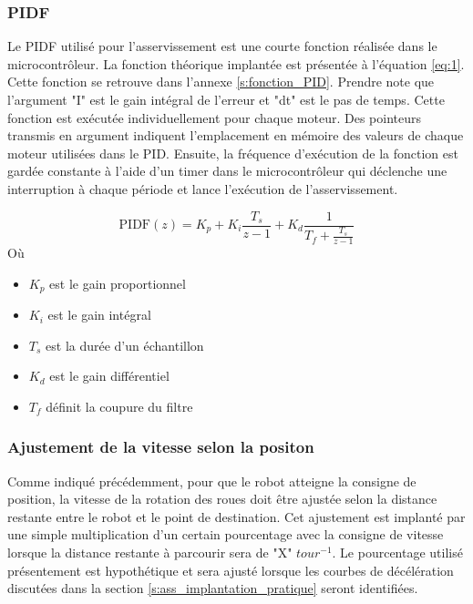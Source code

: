 \subsubsection{PIDF}
Le PIDF utilisé pour l'asservissement est une courte fonction réalisée dans le microcontrôleur. La fonction théorique implantée est présentée à l'équation \ref{eq:1}. Cette fonction se retrouve dans l'annexe \ref{s:fonction_PID}. Prendre note que l'argument "I" est le gain intégral de l'erreur et "dt" est le pas de temps. Cette fonction est exécutée individuellement pour chaque moteur. Des pointeurs transmis en argument indiquent l'emplacement en mémoire des valeurs de chaque moteur utilisées dans le PID. Ensuite, la fréquence d'exécution de la fonction est gardée constante à l'aide d'un timer dans le microcontrôleur qui déclenche une interruption à chaque période et lance l'exécution de l'asservissement.

\begin{equation}
\label{eq:1}
\mbox{PIDF}(z) = K_p + K_i \frac{T_s}{z-1} + K_d \frac{1}{T_f + \frac{T_s}{z -1}}
\end{equation}
Où
\begin{itemize}
\item $K_p$ est le gain proportionnel
\item $K_i$ est le gain intégral
\item $T_s$ est la durée d'un échantillon
\item $K_d$ est le gain différentiel
\item $T_f$ définit la coupure du filtre
\end{itemize}
\subsubsection{Ajustement de la vitesse selon la positon}
Comme indiqué précédemment, pour que le robot atteigne la consigne de position, la vitesse de la rotation des roues doit être ajustée selon la distance restante entre le robot et le point de destination. Cet ajustement est implanté par une simple multiplication d'un certain pourcentage avec la consigne de vitesse lorsque la distance restante à parcourir sera de "X" $tour^{-1}$. Le pourcentage utilisé présentement est hypothétique et sera ajusté lorsque les courbes de décélération discutées dans la section \ref{s:ass_implantation_pratique} seront identifiées.

